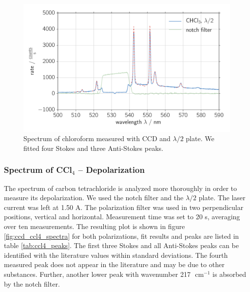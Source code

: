 \begin{figure}[htpb]
    \centering
    \includegraphics[width=0.8\linewidth]{analysis/figures/ccd_chcl3_spectra}
    \caption{
        Spectrum of chloroform measured with CCD and $\lambda / 2$ plate. We fitted four Stokes and 
        three Anti-Stokes peaks.
    }
    \label{fig:ccd_chcl3_spectra}
\end{figure}

\subsubsection{Spectrum of CCl$_4$ -- Depolarization}
The spectrum of carbon tetrachloride is analyzed more thoroughly in order to measure its depolarization. We used 
the notch filter and the $\lambda / 2$ plate. The laser current was left at 1.50 A. The polarization filter was 
used in two perpendicular positions, vertical and horizontal. Measurement time was set to 20 s, averaging over 
ten measurements. The resulting plot is shown in figure \ref{fig:ccd_ccl4_spectra} for both polarizations, fit results 
and peaks are listed in table \ref{tab:ccl4_peaks}. The first three Stokes and all Anti-Stokes peaks can be 
identified with the literature values within standard deviations. The fourth measured peak does not appear 
in the literature and may be due to other substances. Further, another lower peak with wavenumber 217
$\text{ cm}^{-1}$ is absorbed by the notch filter.

